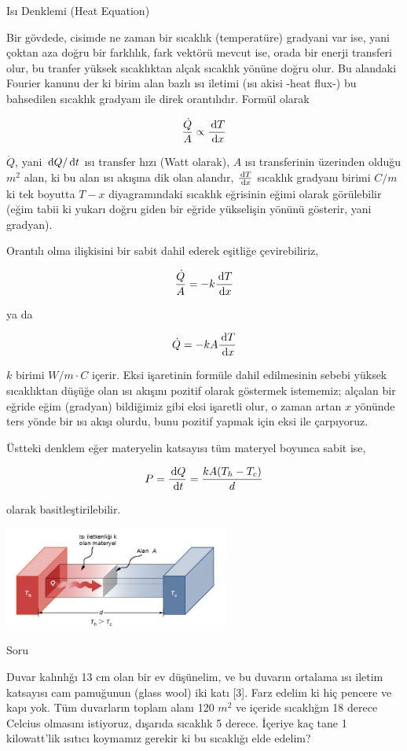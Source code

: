\documentclass[12pt,fleqn]{article}\usepackage{../../common}
\begin{document}
Isı Denklemi (Heat Equation)

Bir gövdede, cisimde ne zaman bir sıcaklık (temperatüre) gradyani var ise, yani
çoktan aza doğru bir farklılık, fark vektörü mevcut ise, orada bir enerji
transferi olur, bu tranfer yüksek sıcaklıktan alçak sıcaklık yönüne doğru
olur. Bu alandaki Fourier kanunu der ki birim alan bazlı ısı iletimi (ısı akisi
-heat flux-) bu bahsedilen sıcaklık gradyanı ile direk orantılıdır. Formül
olarak

$$
\frac{\dot{Q}}{A} \propto \frac{\,\mathrm{d} T}{\,\mathrm{d} x}
$$

$\dot{Q}$, yani $\,\mathrm{d} Q / \,\mathrm{d} t$ ısı transfer hızı (Watt olarak), $A$ ısı
transferinin üzerinden olduğu $m^2$ alan, ki bu alan ısı akışına dik olan
alandır, $\frac{\,\mathrm{d} T}{\,\mathrm{d} x}$ sıcaklık gradyanı birimi $C / m$ ki tek boyutta
$T-x$ diyagramındaki sıcaklık eğrisinin eğimi olarak görülebilir (eğim tabii ki
yukarı doğru giden bir eğride yükselişin yönünü gösterir, yani gradyan).

Orantılı olma ilişkisini bir sabit dahil ederek eşitliğe çevirebiliriz,

$$
\frac{\dot{Q}}{A} = -k \frac{\,\mathrm{d} T}{\,\mathrm{d} x}
$$

ya da

$$
\dot{Q} = -k A \frac{\,\mathrm{d} T}{\,\mathrm{d} x}
$$

$k$ birimi $W/m \cdot C$ içerir. Eksi işaretinin formüle dahil edilmesinin sebebi
yüksek sıcaklıktan düşüğe olan ısı akışını pozitif olarak göstermek istememiz;
alçalan bir eğride eğim (gradyan) bildiğimiz gibi eksi işaretli olur, o zaman
artan $x$ yönünde ters yönde bir ısı akışı olurdu, bunu pozitif yapmak için eksi
ile çarpıyoruz.

Üstteki denklem eğer materyelin katsayısı tüm materyel boyunca sabit ise, 

$$
P = \frac{\,\mathrm{d} Q}{\,\mathrm{d} t} = \frac{k A (T_h - T_c)}{d}
$$

olarak basitleştirilebilir.

\includegraphics[width=20em]{heat_2.png}

Soru

Duvar kalınlığı 13 cm olan bir ev düşünelim, ve bu duvarın ortalama ısı iletim
katsayısı cam pamuğunun (glass wool) iki katı [3]. Farz edelim ki hiç pencere ve
kapı yok. Tüm duvarların toplam alanı 120 $m^2$ ve içeride sıcaklığın 18 derece
Celcius olmasını istiyoruz, dışarıda sıcaklık 5 derece. İçeriye kaç tane 1
kilowatt'lik ısıtıcı koymamız gerekir ki bu sıcaklığı elde edelim?
\end{document}
